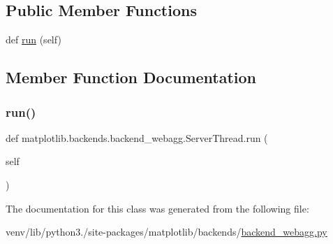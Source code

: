 \subsection*{Public Member Functions}
\begin{DoxyCompactItemize}
\item 
def \hyperlink{classmatplotlib_1_1backends_1_1backend__webagg_1_1ServerThread_a1cfd9a5c33519c6b81ba5fc4e7c5f114}{run} (self)
\end{DoxyCompactItemize}


\subsection{Member Function Documentation}
\mbox{\label{classmatplotlib_1_1backends_1_1backend__webagg_1_1ServerThread_a1cfd9a5c33519c6b81ba5fc4e7c5f114}} 
\subsubsection{\texorpdfstring{run()}{run()}}
{\footnotesize\ttfamily def matplotlib.\+backends.\+backend\+\_\+webagg.\+Server\+Thread.\+run (\begin{DoxyParamCaption}\item[{}]{self }\end{DoxyParamCaption})}



The documentation for this class was generated from the following file\+:\begin{DoxyCompactItemize}
\item 
venv/lib/python3./site-\/packages/matplotlib/backends/\hyperlink{backend__webagg_8py}{backend\+\_\+webagg.\+py}\end{DoxyCompactItemize}
